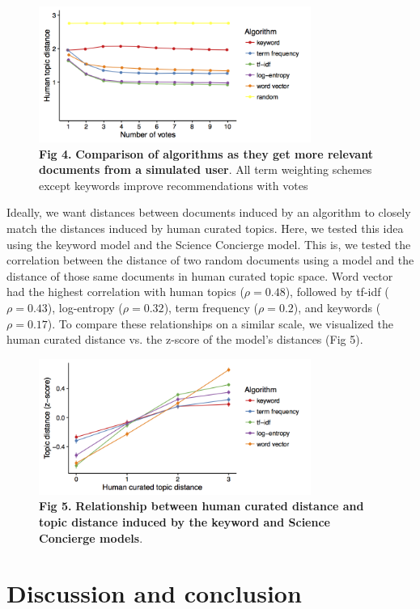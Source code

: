 \documentclass[a4paper]{article}
\begin{document}
\begin{figure}[!ht]
\centering
\includegraphics[width=3.5in]{performance_vs_votes}
\caption*{\textbf{Fig 4.} \textbf{Comparison of algorithms as they get more relevant documents from a simulated user}. All term weighting schemes except keywords
improve recommendations with votes}
\end{figure}

Ideally, we want distances between documents induced by an algorithm to closely match the distances induced by human curated topics. Here, we tested this idea using the keyword model and the Science Concierge model. This is, we tested the correlation between the distance of two random documents using a model and the distance of those same documents in human curated topic space.  Word vector had the highest correlation with human topics ($\rho = 0.48$), followed by tf-idf ($\rho = 0.43$), log-entropy ($\rho = 0.32$), term frequency ($\rho = 0.2$),
and keywords ($\rho = 0.17$). To compare these relationships on a similar scale, we visualized the human curated distance vs. the z-score of the model’s distances (Fig 5).


\begin{figure}[!ht]
\centering
\includegraphics[width=3.5in]{human_vs_topic_distance}
\caption*{\textbf{Fig 5.} \textbf{Relationship between human curated distance and topic distance induced by the keyword and Science Concierge models}.
}
\end{figure}


\section{Discussion and conclusion}
\end{document}
